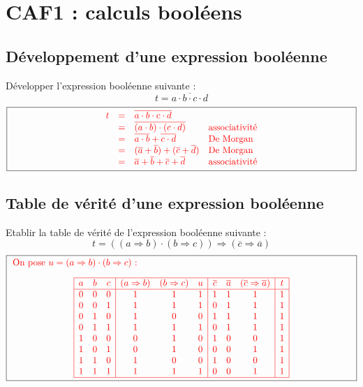 \newpage
\section*{CAF1 : calculs booléens}\label{caf1}

\subsection*{Développement d'une expression booléenne}
Développer l'expression booléenne suivante : 
$$t = \overline{a \cdot b \cdot c \cdot d}$$
$$\framebox[13.5cm]{\color{red}
$\begin{array}{llll}
t &=& \overline{a \cdot b \cdot c \cdot d} & \\
  &=& \overline{(a \cdot b) \cdot (c \cdot d)} & \mbox{associativité}\\ 
  &=& \overline{a \cdot b} + \overline{c \cdot d} & \mbox{De Morgan}\\ 
  &=& (\overline{a} + \overline{b}) + (\overline{c} + \overline{d}) & \mbox{De Morgan}\\
  &=& \overline{a} + \overline{b} + \overline{c} + \overline{d} & \mbox{associativité}
\end{array}$}$$

\subsection*{Table de vérité d'une expression booléenne}
Etablir la table de vérité de l'expression booléenne suivante :
$$t = ((a \Rightarrow b) \cdot (b \Rightarrow c)) \Rightarrow (\overline{c} \Rightarrow \overline{a})$$
$$\framebox[13.5cm]{\color{red}
\begin{minipage}{13cm}
On pose $u = (a \Rightarrow b) \cdot (b \Rightarrow c)$ :

$$\begin{array}{|ccc|ccc|ccc|c|}
\hline
a & b & c & (a \Rightarrow b) & (b \Rightarrow c) & u & \overline{c} & \overline{a} & (\overline{c} \Rightarrow \overline{a}) & t \\
\hline
0 & 0 & 0 &   1 & 1 & 1 &   1 & 1 & 1 &   1\\
0 & 0 & 1 &   1 & 1 & 1 &   0 & 1 & 1 &   1\\
0 & 1 & 0 &   1 & 0 & 0 &   1 & 1 & 1 &   1\\
0 & 1 & 1 &   1 & 1 & 1 &   0 & 1 & 1 &   1\\
1 & 0 & 0 &   0 & 1 & 0 &   1 & 0 & 0 &   1\\
1 & 0 & 1 &   0 & 1 & 0 &   0 & 0 & 1 &   1\\
1 & 1 & 0 &   1 & 0 & 0 &   1 & 0 & 0 &   1\\
1 & 1 & 1 &   1 & 1 & 1 &   0 & 0 & 1 &   1\\
\hline
\end{array}$$
\end{minipage}}$$

